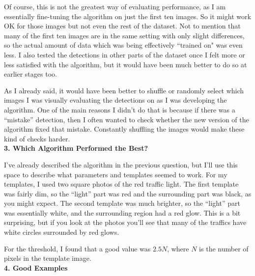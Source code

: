 \documentclass[12pt,letterpaper]{article} \usepackage{fullpage}
\begin{document}
Of course, this is not the greatest way of evaluating performance, as I am essentially
fine-tuning the algorithm on just the first ten images. So it might work OK for those
images but not even the rest of the dataset.
Not to mention that many of the first ten images are in the same setting with only
slight differences, so the actual amount of data which was being effectively ``trained on"
was even less. I also tested the detections in other parts
of the dataset once I felt more or less satisfied with the algorithm, but it would have
been much better to do so at earlier stages too.

As I already said, it would have been better to shuffle or randomly select which images
I was visually evaluating the detections on as I was developing the algorithm. One of
the main reasons I didn't do that is because if there was a ``mistake'' detection,
then I often wanted to check whether the new version of the algorithm fixed that mistake.
Constantly shuffling the images would make these kind of checks harder.\\


\textbf{3. Which Algorithm Performed the Best?}

I've already described the algorithm in the previous question, but I'll use this space
to describe what parameters and templates seemed to work. For my templates, I used
two square photos of the red traffic light. The first template was fairly dim, so the
``light'' part was red and the surrounding part was black, as you might expect.
The second template was much brighter, so the ``light'' part was essentially white,
and the surrounding region had a red glow. This is a bit surprising, but if you look
at the photos you'll see that many of the traffics have white circles surrounded by
red glows.

For the threshold, I found that a good value was $2.5 N$, where $N$ is the number of
pixels in the template image.\\


\textbf{4. Good Examples}
\end{document}
